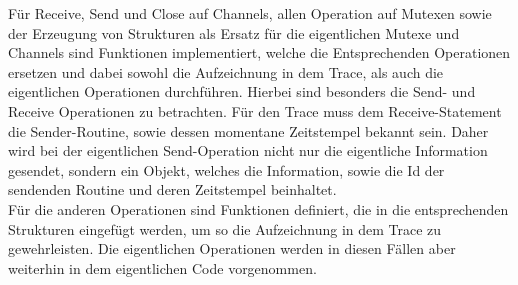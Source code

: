 Für Receive, Send und Close auf Channels,  allen Operation auf Mutexen sowie 
der Erzeugung von Strukturen als Ersatz für die eigentlichen Mutexe und Channels 
sind Funktionen implementiert, welche die Entsprechenden Operationen 
ersetzen und dabei sowohl die Aufzeichnung in dem Trace, als auch die eigentlichen
Operationen durchführen. Hierbei sind besonders die Send- und Receive Operationen 
zu betrachten. Für den Trace muss dem Receive-Statement die Sender-Routine, sowie 
dessen momentane 
Zeitstempel bekannt sein. Daher wird bei der eigentlichen
Send-Operation nicht nur die eigentliche Information gesendet, sondern ein  
Objekt, welches die Information, sowie die Id der sendenden Routine und deren
Zeitstempel beinhaltet.\\Für die anderen Operationen sind Funktionen 
definiert, die in die entsprechenden Strukturen eingefügt werden, um so
die Aufzeichnung in dem Trace zu gewehrleisten. Die eigentlichen Operationen
werden in diesen Fällen aber weiterhin in dem eigentlichen Code vorgenommen.

